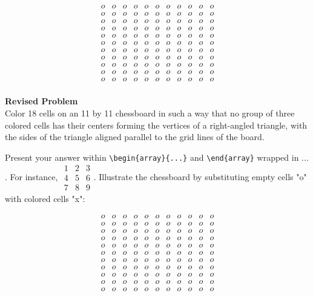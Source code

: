 $$\begin{array}{ccccccccccc}
o & o & o & o & o & o & o & o & o & o & o \\
o & o & o & o & o & o & o & o & o & o & o \\
o & o & o & o & o & o & o & o & o & o & o \\
o & o & o & o & o & o & o & o & o & o & o \\
o & o & o & o & o & o & o & o & o & o & o \\
o & o & o & o & o & o & o & o & o & o & o \\
o & o & o & o & o & o & o & o & o & o & o \\
o & o & o & o & o & o & o & o & o & o & o \\
o & o & o & o & o & o & o & o & o & o & o \\
o & o & o & o & o & o & o & o & o & o & o \\
o & o & o & o & o & o & o & o & o & o & o \\
\end{array}$$


\textbf{Revised Problem}\\
Color 18 cells on an 11 by 11 chessboard in such a way that no group of three colored cells has their centers forming the vertices of a right-angled triangle, with the sides of the triangle aligned parallel to the grid lines of the board.

Present your answer within \verb|\begin{array}{...}| and \verb|\end{array}| wrapped in $\boxed{...}$. For instance, $\boxed{\begin{array}{ccc}1 & 2 & 3 \\ 4 & 5 & 6 \\ 7 & 8 & 9\end{array}}$.
Illustrate the chessboard by substituting empty cells "o" with colored cells "x":

$$\begin{array}{ccccccccccc}
o & o & o & o & o & o & o & o & o & o & o \\
o & o & o & o & o & o & o & o & o & o & o \\
o & o & o & o & o & o & o & o & o & o & o \\
o & o & o & o & o & o & o & o & o & o & o \\
o & o & o & o & o & o & o & o & o & o & o \\
o & o & o & o & o & o & o & o & o & o & o \\
o & o & o & o & o & o & o & o & o & o & o \\
o & o & o & o & o & o & o & o & o & o & o \\
o & o & o & o & o & o & o & o & o & o & o \\
o & o & o & o & o & o & o & o & o & o & o \\
o & o & o & o & o & o & o & o & o & o & o \\
\end{array}$$

